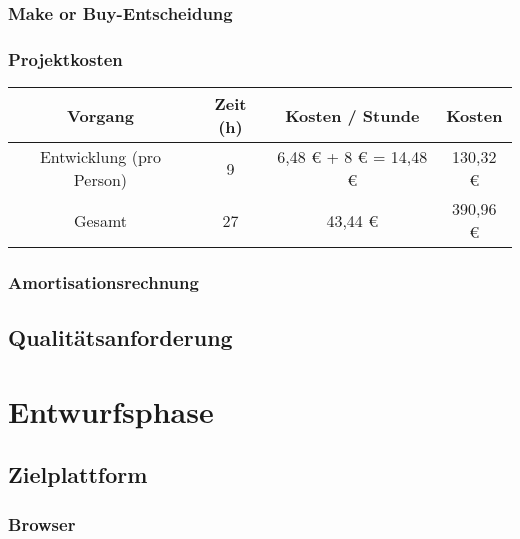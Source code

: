 \documentclass[ngerman,11pt,a4paper,titlepage]{article}
\begin{document}
	\subsubsection{Make or Buy-Entscheidung}
	\label{subsubsec:makeorbuy}
	\makeorbuyText
	
	\subsubsection{Projektkosten}
	\label{subsubsec:projektkosten}
	\projektkostenText
	\neuerAbsatz
	\begin{tabular}{|c|c|c|c|}
		Vorgang & Zeit (h) & Kosten / Stunde & Kosten \\
		\hline
		Entwicklung (pro Person) & 9 & 6,48 € + 8 € = 14,48 € & 130,32 € \\
		\hline
		Gesamt & 27 & 43,44 € & 390,96 €
		\label{tab:tabelle2}
	\end{tabular}
	
	\subsubsection{Amortisationsrechnung}
	\label{subsubsec:amortisationsrechnung}
	\amortisationsrechnungText
	
	\subsection{Qualitätsanforderung}
	\label{subsec:qualitaetsanforderung}
	\qualitaetsanforderungText
	
	
	\section{Entwurfsphase}
	\label{sec:entwurfsphase}
	\entwurfsphaseText
	
	\subsection{Zielplattform}
	\label{subsec:zielplattform}
	\zielplattformText
	
	\subsubsection{Browser}
	\label{subsubsec:plattform}
	\plattformText
	
\end{document}

